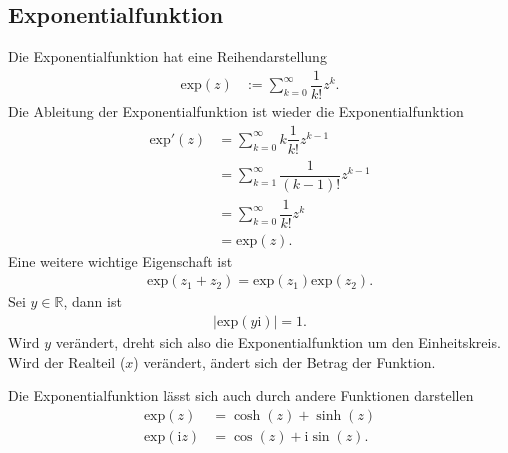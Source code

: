 \documentclass[a4paper,12pt]{article}
\numberwithin{equation}{section}
\begin{document}
\subsection{Exponentialfunktion}
Die Exponentialfunktion hat eine Reihendarstellung
\begin{align} 
        \text{exp}\left(z\right)&:=\sum_{k=0}^{\infty}\dfrac{1}{k!}z^k
.\end{align} 
Die Ableitung der Exponentialfunktion ist wieder die Exponentialfunktion
\begin{align} 
        \text{exp}'\left(z\right)&=\sum_{k=0}^{\infty}k\dfrac{1}{k!}z^{k-1}\\
                                     &=\sum_{k=1}^{\infty}\dfrac{1}{\left(k-1\right)!}z^{k-1}\\
                                     &=\sum_{k=0}^{\infty}\dfrac{1}{k!}z^k\\
                                     &=\text{exp}\left(z\right)
.\end{align} 
Eine weitere wichtige Eigenschaft ist 
\begin{align} 
        \text{exp}\left(z_1+z_2\right)=\text{exp}\left(z_1\right)\text{exp}\left(z_2\right)
.\end{align} 
Sei $y \in \mathbb{R}$, dann ist
\begin{align} 
        |\text{exp}\left(y\text{i}\right)|=1
.\end{align} 
Wird $y$ verändert, dreht sich also die Exponentialfunktion um den Einheitskreis. Wird der Realteil ($x$) verändert, ändert sich der Betrag der Funktion.\par
Die Exponentialfunktion lässt sich auch durch andere Funktionen darstellen
\begin{align} 
        \text{exp}\left(z\right)&=\cosh \left(z\right)+\sinh \left(z\right)\\
        \text{exp}\left(\text{i}z\right)&=\cos \left(z\right)+\text{i}\sin \left(z\right)
.\end{align} 

\end{document}
